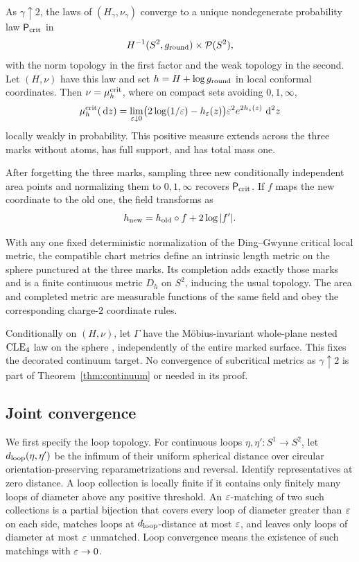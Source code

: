 \begin{theorem}\label{thm:continuum}
As $\gamma\uparrow2$, the laws of $(H_\gamma,\nu_\gamma)$ converge to a unique nondegenerate probability law $\mathsf P_{\rm crit}$ in
\[
 H^{-1}(S^2,g_{\rm round})\times\mathcal P(S^2),
\]
with the norm topology in the first factor and the weak topology in the second. Let $(H,\nu)$ have this law and set $h=H+\log g_{\rm round}$ in local conformal coordinates. Then $\nu=\mu_h^{\rm crit}$, where on compact sets avoiding $0,1,\infty$,
\begin{equation}\label{intro:critical-area}
 \mu_h^{\rm crit}(\,\mathrm d z)
 =\lim_{\varepsilon\downarrow0}
  \bigl(2\log(1/\varepsilon)-h_\varepsilon(z)\bigr)
        \varepsilon^2e^{2h_\varepsilon(z)}\,\,\mathrm d^2z
\end{equation}
locally weakly in probability. This positive measure extends across the three marks without atoms, has full support, and has total mass one.

After forgetting the three marks, sampling three new conditionally independent area points and normalizing them to $0,1,\infty$ recovers $\mathsf P_{\rm crit}$. If $f$ maps the new coordinate to the old one, the field transforms as
\[
 h_{\rm new}=h_{\rm old}\circ f+2\log|f'|.
\]

With any one fixed deterministic normalization of the Ding--Gwynne critical local metric, the compatible chart metrics define an intrinsic length metric on the sphere punctured at the three marks. Its completion adds exactly those marks and is a finite continuous metric $D_h$ on $S^2$, inducing the usual topology. The area and completed metric are measurable functions of the same field and obey the corresponding charge-$2$ coordinate rules.
\end{theorem}

Conditionally on $(H,\nu)$, let $\Gamma$ have the M\"obius-invariant whole-plane nested $\mathrm{CLE}_4$ law on the sphere \cite{KWnested}, independently of the entire marked surface. This fixes the decorated continuum target. No convergence of subcritical metrics as $\gamma\uparrow2$ is part of Theorem~\ref{thm:continuum} or needed in its proof.

\subsection{Joint convergence}

We first specify the loop topology. For continuous loops $\eta,\eta':S^1\to S^2$, let $d_{\rm loop}(\eta,\eta')$ be the infimum of their uniform spherical distance over circular orientation-preserving reparametrizations and reversal. Identify representatives at zero distance. A loop collection is locally finite if it contains only finitely many loops of diameter above any positive threshold. An $\varepsilon$-matching of two such collections is a partial bijection that covers every loop of diameter greater than $\varepsilon$ on each side, matches loops at $d_{\rm loop}$-distance at most $\varepsilon$, and leaves only loops of diameter at most $\varepsilon$ unmatched. Loop convergence means the existence of such matchings with $\varepsilon\to0$.

